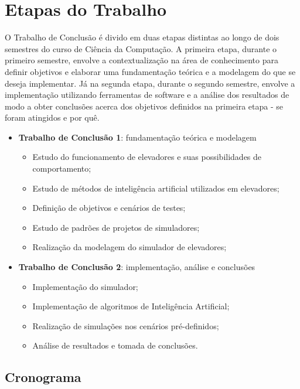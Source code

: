 \chapter{\label{chap:stages}Etapas do Trabalho}

O Trabalho de Conclusão é divido em duas etapas distintas ao longo de dois
semestres do curso de Ciência da Computação. A primeira etapa, durante o
primeiro semestre, envolve a contextualização na área de conhecimento para
definir objetivos e elaborar uma fundamentação teórica e a modelagem do que se
deseja implementar. Já na segunda etapa, durante o segundo semestre, envolve a
implementação utilizando ferramentas de software e a análise dos resultados de
modo a obter conclusões acerca dos objetivos definidos na primeira etapa - se
foram atingidos e por quê.

\begin{itemize}
  \item \textbf{Trabalho de Conclusão 1}: fundamentação teórica e modelagem
  \begin{itemize}
    \item Estudo do funcionamento de elevadores e suas possibilidades de
          comportamento;
    \item Estudo de métodos de inteligência artificial utilizados em elevadores;
    \item Definição de objetivos e cenários de testes;
    \item Estudo de padrões de projetos de simuladores;
    \item Realização da modelagem do simulador de elevadores;
  \end{itemize}
  \item \textbf{Trabalho de Conclusão 2}: implementação, análise e conclusões
  \begin{itemize}
    \item Implementação do simulador;
    \item Implementação de algoritmos de Inteligência Artificial;
    \item Realização de simulações nos cenários pré-definidos;
    \item Análise de resultados e tomada de conclusões.
  \end{itemize}
\end{itemize}

\section{Cronograma}

